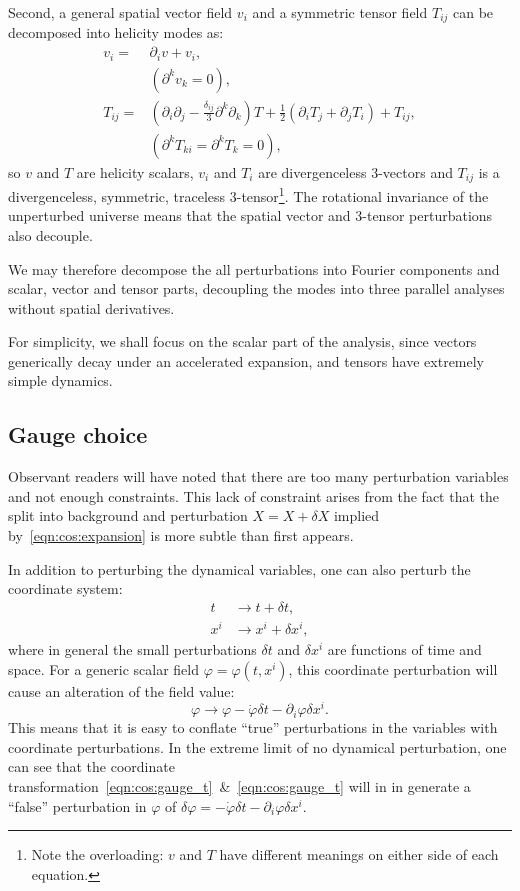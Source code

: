 Second, a general spatial vector field $v_i$ and a symmetric tensor field $T_{ij}$ can be decomposed into helicity modes as:
\begin{align}
  v_i =& \partial_i v + v_i,   \nonumber\\
  &(\partial^k v_k=0), \\
  T_{ij} =& (\partial_i\partial_j - \frac{\delta_{ij}}{3}\partial^k\partial_k)T + \frac{1}{2}(\partial_i T_j + \partial_j T_i) + T_{ij} \nonumber,\\ 
  &(\partial^k T_{ki} = \partial^k T_k = 0),
\end{align}
so $v$ and $T$ are helicity scalars, $v_i$ and $T_i$ are divergenceless 3-vectors and $T_{ij}$ is a divergenceless, symmetric, traceless 3-tensor\footnote{Note the overloading: $v$ and $T$ have different meanings on either side of each equation.}.
  The rotational invariance of the unperturbed universe means that the spatial vector and 3-tensor perturbations also decouple.

We may therefore decompose the all perturbations into Fourier components and scalar, vector and tensor parts, decoupling the modes into three parallel analyses without spatial derivatives.

For simplicity, we shall focus on the scalar part of the analysis, since vectors generically decay under an accelerated expansion, and tensors have extremely simple dynamics.

\subsection{Gauge choice}
Observant readers will have noted that there are too many perturbation variables and not enough constraints.
This lack of constraint arises from the fact that the split into background and perturbation $X=X+\delta X$ implied by~\eqref{eqn:cos:expansion} is more subtle than first appears. 

In addition to perturbing the dynamical variables, one can also perturb the coordinate system:
\begin{align}
  t &\rightarrow t + \delta t,
  \label{eqn:cos:gauge_t}
  \\
  x^i &\rightarrow x^i  + \delta x^i,
  \label{eqn:cos:gauge_x}
\end{align}
where in general the small perturbations $\delta t$ and $\delta x^i$ are functions of time and space.
For a generic scalar field $\varphi = \varphi(t,x^i)$, this coordinate perturbation will cause an alteration of the field value:
\begin{equation}
  \varphi \rightarrow \varphi - \dot{\varphi}\delta t - \partial_i\varphi\delta x^i.
\end{equation}
This means that it is easy to conflate ``true'' perturbations in the variables with coordinate perturbations. In the extreme limit of no dynamical perturbation, one can see that the coordinate transformation~\eqref{eqn:cos:gauge_t}~\&~\eqref{eqn:cos:gauge_t} will in in generate a ``false'' perturbation in $\varphi$ of $\delta\varphi = -\dot{\varphi}\delta t - \partial_i\varphi\delta x^i$.

